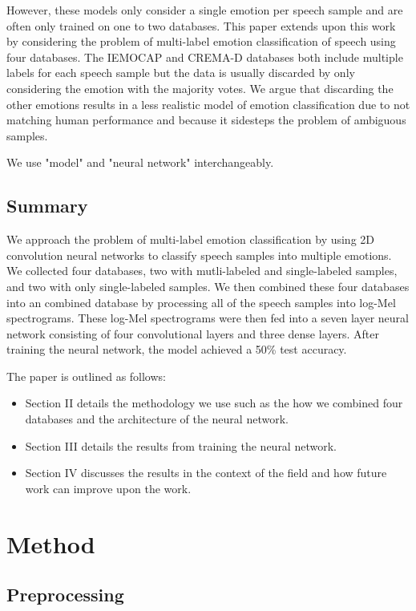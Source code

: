 \documentclass[conference]{IEEEtran}
\begin{document}
However, these models only consider a single emotion per speech sample and are often only trained on one to two databases. This paper extends upon this work by considering the problem of multi-label emotion classification of speech using four databases. The IEMOCAP and CREMA-D databases both include multiple labels for each speech sample but the data is usually discarded by only considering the emotion with the majority votes. We argue that discarding the other emotions results in a less realistic model of emotion classification due to not matching human performance and because it sidesteps the problem of ambiguous samples.

We use "model" and "neural network" interchangeably.

\subsection{Summary}

We approach the problem of multi-label emotion classification by using 2D convolution neural networks to classify speech samples into multiple emotions. We collected four databases, two with mutli-labeled and single-labeled samples, and two with only single-labeled samples. We then combined these four databases into an combined database by processing all of the speech samples into log-Mel spectrograms. These log-Mel spectrograms were then fed into a seven layer neural network consisting of four convolutional layers and three dense layers. After training the neural network, the model achieved a 50\% test accuracy.

The paper is outlined as follows:
\begin{itemize}
	\item Section II details the methodology we use such as the how we combined four databases and the architecture of the neural network.
	\item Section III details the results from training the neural network.
	\item Section IV discusses the results in the context of the field and how future work can improve upon the work.
\end{itemize}

\section{Method}

\subsection{Preprocessing}
\end{document}
